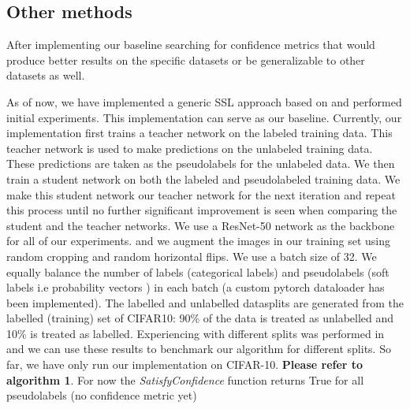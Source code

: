 \documentclass{article}
\begin{document}
\subsection{Other methods}
After implementing our baseline searching for confidence metrics that would produce better results on the specific datasets or be generalizable to other datasets as well. 




As of now, we have implemented a generic SSL approach based on \cite{xie2019selftraining} and performed initial experiments. This implementation can serve as our baseline. Currently, our implementation first trains a teacher network on the labeled training data. This teacher network is used to make predictions on the unlabeled training data. These predictions are taken as the pseudolabels for the unlabeled data. We then train a student network on both the labeled and pseudolabeled training data. We make this student network our teacher network for the next iteration and repeat this process until no further significant improvement is seen when comparing the student and the teacher networks. We use a ResNet-50 network as the backbone for all of our experiments. and we augment the images in our training set using random cropping and random horizontal flips. We use a batch size of 32. We equally balance the number of labels (categorical labels) and pseudolabels (soft labels i.e probability vectors ) in each batch (a custom pytorch dataloader has been implemented). The labelled and unlabelled datasplits are generated from the labelled (training) set of CIFAR10: 90\% of the data is treated as unlabelled and 10\% is treated as labelled. Experiencing with different splits was performed in \cite{Berthelot2019MixMatch:Learning} and we can use these results to benchmark our algorithm for different splits. So far, we have only run our implementation on CIFAR-10. \textbf{Please refer to algorithm 1}. For now the \textit{SatisfyConfidence} function returns True for all pseudolabels (no confidence metric yet)
\end{document}
